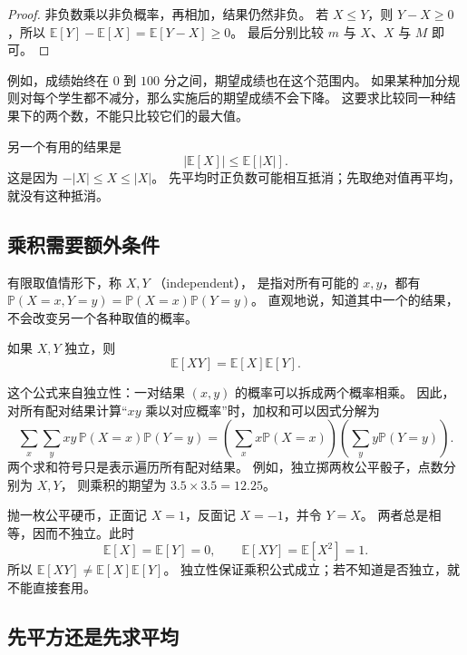 \documentclass[UTF8]{ctexart}
\begin{document}
\begin{proof}
非负数乘以非负概率，再相加，结果仍然非负。
若 $X\leq Y$，则 $Y-X\geq0$，所以
$\mathbb E[Y]-\mathbb E[X]=\mathbb E[Y-X]\geq0$。
最后分别比较 $m$ 与 $X$、$X$ 与 $M$ 即可。
\end{proof}

例如，成绩始终在 $0$ 到 $100$ 分之间，期望成绩也在这个范围内。
如果某种加分规则对每个学生都不减分，那么实施后的期望成绩不会下降。
这要求比较同一种结果下的两个数，不能只比较它们的最大值。

另一个有用的结果是
\[
  |\mathbb E[X]|\leq\mathbb E[|X|].
\]
这是因为 $-|X|\leq X\leq|X|$。
先平均时正负数可能相互抵消；先取绝对值再平均，就没有这种抵消。

\subsection{乘积需要额外条件}

有限取值情形下，称 $X,Y$ （independent），
是指对所有可能的 $x,y$，都有
$\mathbb P(X=x,Y=y)=\mathbb P(X=x)\mathbb P(Y=y)$。
直观地说，知道其中一个的结果，不会改变另一个各种取值的概率。

\begin{property}[独立变量乘积的期望]
\label{prop:basic-expectation-product}
如果 $X,Y$ 独立，则
\begin{equation}
  \mathbb E[XY]=\mathbb E[X]\mathbb E[Y].
  \label{eq:basic-expectation-product}
\end{equation}
\end{property}

这个公式来自独立性：一对结果 $(x,y)$ 的概率可以拆成两个概率相乘。
因此，对所有配对结果计算“$xy$ 乘以对应概率”时，加权和可以因式分解为
\[
  \sum_x\sum_y xy\,\mathbb P(X=x)\mathbb P(Y=y)
  =\left(\sum_x x\mathbb P(X=x)\right)
   \left(\sum_y y\mathbb P(Y=y)\right).
\]
两个求和符号只是表示遍历所有配对结果。
例如，独立掷两枚公平骰子，点数分别为 $X,Y$，
则乘积的期望为 $3.5\times3.5=12.25$。

\begin{example}[不独立时不能直接拆乘积]
\label{ex:basic-expectation-product-failure}
抛一枚公平硬币，正面记 $X=1$，反面记 $X=-1$，并令 $Y=X$。
两者总是相等，因而不独立。此时
\[
  \mathbb E[X]=\mathbb E[Y]=0,\qquad
  \mathbb E[XY]=\mathbb E[X^2]=1.
\]
所以 $\mathbb E[XY]\neq\mathbb E[X]\mathbb E[Y]$。
独立性保证乘积公式成立；若不知道是否独立，就不能直接套用。
\end{example}

\subsection{先平方还是先求平均}
\end{document}
